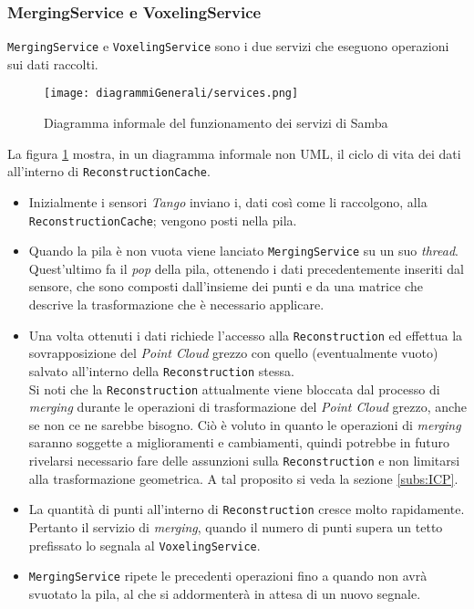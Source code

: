 \subsubsection{MergingService e VoxelingService}
\texttt{MergingService} e \texttt{VoxelingService} sono i due servizi che eseguono operazioni sui dati raccolti.
\begin{figure}[!h] 
    \centering 
    \texttt{[image: diagrammiGenerali/services.png]} 
    \caption{Diagramma informale del funzionamento dei servizi di Samba}
    \label{fig:services}
\end{figure}
La figura \ref{fig:services} mostra, in un diagramma informale non UML, il ciclo di vita dei dati all'interno di \texttt{ReconstructionCache}.
\begin{itemize}
	\item Inizialmente i sensori \emph{Tango} inviano i, dati così come li raccolgono, alla \texttt{ReconstructionCache}; vengono posti nella pila.
	\item Quando la pila è non vuota viene lanciato \texttt{MergingService} su un suo \emph{thread}. Quest'ultimo fa il \emph{pop} della pila, ottenendo i dati precedentemente inseriti dal sensore, che sono composti dall'insieme dei punti e da una matrice che descrive la trasformazione che è necessario applicare.
	\item Una volta ottenuti i dati richiede l'accesso alla \texttt{Reconstruction} ed effettua la sovrapposizione del \emph{Point Cloud} grezzo con quello (eventualmente vuoto) salvato all'interno della \texttt{Reconstruction} stessa.\\Si noti che la \texttt{Reconstruction} attualmente viene bloccata dal processo di \emph{merging} durante le operazioni di trasformazione del \emph{Point Cloud} grezzo, anche se non ce ne sarebbe bisogno. Ciò è voluto in quanto le operazioni di \emph{merging} saranno soggette a miglioramenti e cambiamenti, quindi potrebbe in futuro rivelarsi necessario fare delle assunzioni sulla \texttt{Reconstruction} e non limitarsi alla trasformazione geometrica. A tal proposito si veda la sezione \ref{subs:ICP}.
	\item La quantità di punti all'interno di \texttt{Reconstruction} cresce molto rapidamente. Pertanto il servizio di \emph{merging}, quando il numero di punti supera un tetto prefissato lo segnala al \texttt{VoxelingService}.
	\item \texttt{MergingService} ripete le precedenti operazioni fino a quando non avrà svuotato la pila, al che si addormenterà in attesa di un nuovo segnale.

\end{itemize}
